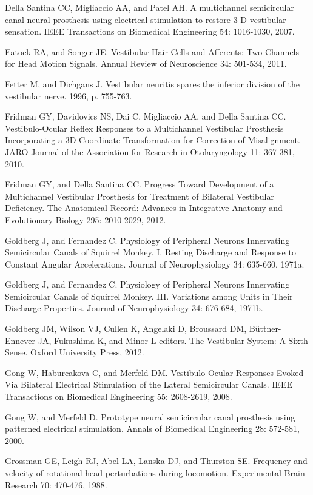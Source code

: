{Della Santina CC, Migliaccio AA, and Patel AH. A multichannel semicircular canal neural prosthesis using electrical stimulation to restore 3-D vestibular sensation. IEEE Transactions on Biomedical Engineering 54: 1016-1030, 2007.

Eatock RA, and Songer JE. Vestibular Hair Cells and Afferents: Two Channels for Head Motion Signals. Annual Review of Neuroscience 34: 501-534, 2011.

Fetter M, and Dichgans J. Vestibular neuritis spares the inferior division of the vestibular nerve. 1996, p. 755-763.

Fridman GY, Davidovics NS, Dai C, Migliaccio AA, and Della Santina CC. Vestibulo-Ocular Reflex Responses to a Multichannel Vestibular Prosthesis Incorporating a 3D Coordinate Transformation for Correction of Misalignment. JARO-Journal of the Association for Research in Otolaryngology 11: 367-381, 2010.

Fridman GY, and Della Santina CC. Progress Toward Development of a Multichannel Vestibular Prosthesis for Treatment of Bilateral Vestibular Deficiency. The Anatomical Record: Advances in Integrative Anatomy and Evolutionary Biology 295: 2010-2029, 2012.

Goldberg J, and Fernandez C. Physiology of Peripheral Neurons Innervating Semicircular Canals of Squirrel Monkey. I. Resting Discharge and Response to Constant Angular Accelerations. Journal of Neurophysiology 34: 635-660, 1971a.

Goldberg J, and Fernandez C. Physiology of Peripheral Neurons Innervating Semicircular Canals of Squirrel Monkey. III. Variations among Units in Their Discharge Properties. Journal of Neurophysiology 34: 676-684, 1971b.

Goldberg JM, Wilson VJ, Cullen K, Angelaki D, Broussard DM, Büttner-Ennever JA, Fukushima K, and Minor L editors. The Vestibular System: A Sixth Sense. Oxford University Press, 2012.

Gong W, Haburcakova C, and Merfeld DM. Vestibulo-Ocular Responses Evoked Via Bilateral Electrical Stimulation of the Lateral Semicircular Canals. IEEE Transactions on Biomedical Engineering 55: 2608-2619, 2008.

Gong W, and Merfeld D. Prototype neural semicircular canal prosthesis using patterned electrical stimulation. Annals of Biomedical Engineering 28: 572-581, 2000.

Grossman GE, Leigh RJ, Abel LA, Lanska DJ, and Thurston SE. Frequency and velocity of rotational head perturbations during locomotion. Experimental Brain Research 70: 470-476, 1988.

}
